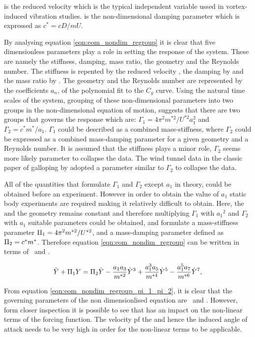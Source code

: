 \ustar is the reduced velocity which is the typical independent variable ussed in vortex-induced vibration studies. \cstar is the non-dimensional damping parameter which is expressed as $c^*=cD/mU$. 

By analysing equation \ref{eqn:eom_nondim_regroup} it is clear that five dimensionless parameters play a role in setting the response of the system. These are namely the stiffness, damping, mass ratio, the geometry and the Reynolds number. The stiffness is repented by the reduced velocity \ustar, the damping by \cstar and the mass ratio by \mstar. The geometry and the Reynolds number are represented by the coefficients $a_n$, of the polynomial fit to the $C_y$ curve. Using the natural time scales of the system, grouping of these non-dimensional parameters into two groups in the non-dimensional equation of motion, suggests that there are two groups that governs the response which are: $\Gamma_1 = 4\pi^2m^{*2}/U^{*2}a_1^2$ and $\Gamma_2 = c^*m^*/a_1$. $\Gamma_1$ could be described as a combined mass-stiffness, where $\Gamma_2$ could be expressed as a combined mass-damping parameter for a given geometry and a Reynolds number. It is assumed that the stiffness plays a minor role, $\Gamma_2$ seems more likely parameter to collapse the data. The wind tunnel data in the classic paper of galloping by \citep{Parkinson1964} adopted a parameter similar to $\Gamma_2$ to collapse the data. 

All of the quantities that formulate $\Gamma_1$ and $\Gamma_2$ except $a_1$ in theory, could be obtained before an experiment. However in order to obtain the value of $a_1$ static body experiments are required making it relatively difficult to obtain. Here, the \reynoldsnumber and the geometry remains constant and therefore multiplying $\Gamma_1$ with ${a_1}^2$ and $\Gamma_2$ with $a_1$ suitable parameters could be obtained, and formulate a mass-stiffness parameter $\Pi_1 =  4\pi^2m^{*2}/U^{*2}$, and a mass-damping parameter defined as $\Pi_2 = c^*m^*$. Therefore equation \ref{eqn:eom_nondim_regroup} can be written in terms of \massstiff \ and \massdamp. 

  \begin{equation}
  \label{eqn:eom_nondim_regroup_pi_1_pi_2}
  \ddot{Y} + \Pi_1 Y = \Pi_2 \dot{Y} - \frac{a_1a_3}{m^{*2}}\dot{Y}^3 + \frac{a_1^3a_5}{m^{*4}}\dot{Y}^5 - \frac{a_1^5a_7}{m^{*6}}\dot{Y}^7,
  \end{equation} 
  
From equation \ref{eqn:eom_nondim_regroup_pi_1_pi_2}, it is clear that the governing parameters of the non dimensionlised equation are \massstiff \ \massdamp and \mstar. However, form closer inspection it is possible to see that \mstar has an impact on the non-linear terms of the forcing function. The velocity pf the and hence the induced angle of attack needs to be very high in order for the non-linear terms to be applicable. 

